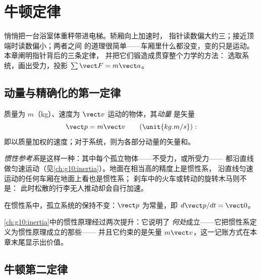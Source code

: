 \chapter{牛顿定律}\label{ch:g12:newtons-laws}

悄悄把一台浴室体重秤带进电梯。轿厢向上加速时，
指针读数偏大约三；接近顶端时读数偏小；两者之间
的道理很简单——车厢里什么都没变，变的只是运动。本章阐明指针背后的三条定律，
并把它们锻造成贯穿整个力学的方法：
选取系统，画出受力，投影 $\sum \vect F = m\vect a$。

\section{动量与精确化的第一定律}

\begin{definition}[动量]\label{def:g12:newtons-laws:momentum}
质量为 $m$（\unit{kg}）、速度为 $\vect v$ 运动的物体，其\emph{动量}
是矢量
\[
\vect p = m \vect v \qquad (\unit{kg.m/s}):
\]
即以质量加权的速度；对于系统，则为各部分动量的矢量和。
\end{definition}

\begin{definition}[惯性参考系]\label{def:g12:newtons-laws:inertial}
\emph{惯性参考系}是这样一种：其中每个孤立物体——不受力，或所受力——
都沿直线做匀速运动（见\cref{ch:g10:inertia}）。地面在相当高的精度上是惯性系，
沿直线匀速运动的任何车厢在地面上看也是惯性系；
刹车中的火车或转动的旋转木马则不是：
此时松散的行李无人推动却会自行加速。
\end{definition}

\begin{theorem}[牛顿第一定律]\label{thm:g12:newtons-laws:first}
在惯性系中，孤立系统的保持不变：$\vect p$
为常量，即 $d\vect p/dt = \vect 0$。
\end{theorem}
\admitted

\begin{remark}[惯性原理的两次精确化]\label{rem:g12:newtons-laws:sharpened}
\cref{ch:g10:inertia}中的惯性原理经过两次提升：它说明了
\emph{何处}成立——它把惯性系定义为惯性原理成立的那些——
并且它约束的是矢量 $m\vect v$，这一记账方式在本章末尾显示出价值。
\end{remark}

\section{牛顿第二定律}

